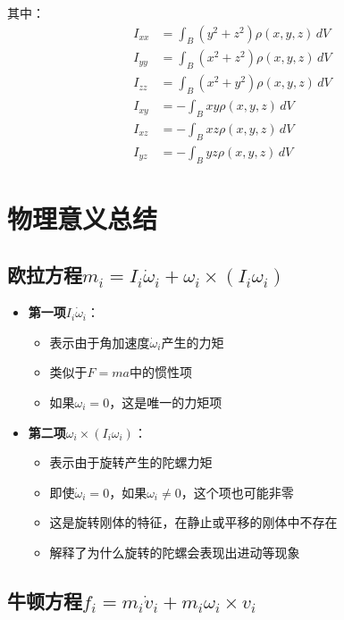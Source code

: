 \documentclass[12pt,a4paper]{article}
\begin{document}
其中：
\begin{align}
I_{xx} &= \int_B (y^2 + z^2) \rho(x,y,z) \, dV \\
I_{yy} &= \int_B (x^2 + z^2) \rho(x,y,z) \, dV \\
I_{zz} &= \int_B (x^2 + y^2) \rho(x,y,z) \, dV \\
I_{xy} &= -\int_B xy \rho(x,y,z) \, dV \\
I_{xz} &= -\int_B xz \rho(x,y,z) \, dV \\
I_{yz} &= -\int_B yz \rho(x,y,z) \, dV
\end{align}

\section{物理意义总结}

\subsection{欧拉方程$m_i = I_i \dot{\omega}_i + \omega_i \times (I_i \omega_i)$}

\begin{itemize}
\item \textbf{第一项$I_i \dot{\omega}_i$}：
\begin{itemize}
\item 表示由于角加速度$\dot{\omega}_i$产生的力矩
\item 类似于$F = ma$中的惯性项
\item 如果$\omega_i = 0$，这是唯一的力矩项
\end{itemize}

\item \textbf{第二项$\omega_i \times (I_i \omega_i)$}：
\begin{itemize}
\item 表示由于旋转产生的陀螺力矩
\item 即使$\dot{\omega}_i = 0$，如果$\omega_i \neq 0$，这个项也可能非零
\item 这是旋转刚体的特征，在静止或平移的刚体中不存在
\item 解释了为什么旋转的陀螺会表现出进动等现象
\end{itemize}
\end{itemize}

\subsection{牛顿方程$f_i = m_i \dot{v}_i + m_i \omega_i \times v_i$}
\end{document}
